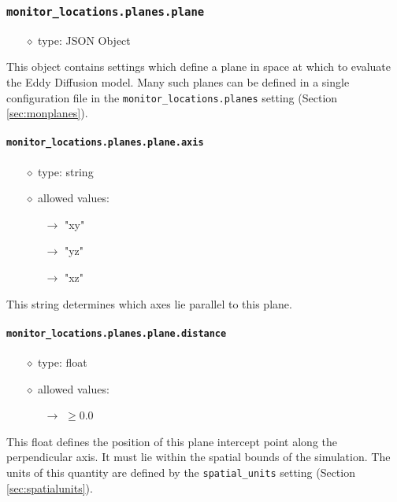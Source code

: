 \documentclass[]{article}
\def\code#1{\texttt{#1}}
\begin{document}
\subsubsection{\code{monitor\_locations.planes.plane}}
\begin{itemize}
    \item[$\diamond$] type: JSON Object 
\end{itemize}
This object contains settings which define a plane in space at which to evaluate
the Eddy Diffusion model. Many such planes can be defined in a single
configuration file in the \code{monitor\_locations.planes} setting (Section
\ref{sec:monplanes}).

\paragraph{\code{monitor\_locations.planes.plane.axis}}
\begin{itemize}
    \item[$\diamond$] type: string 
    \item[$\diamond$] allowed values:
    \begin{itemize}
        \item[$\rightarrow$] "xy"
        \item[$\rightarrow$] "yz"
        \item[$\rightarrow$] "xz"
    \end{itemize}
\end{itemize}
This string determines which axes lie parallel to this plane.

\paragraph{\code{monitor\_locations.planes.plane.distance}}
\begin{itemize}
    \item[$\diamond$] type: float 
    \item[$\diamond$] allowed values:
    \begin{itemize}
        \item[$\rightarrow$] $\geq0.0$ 
    \end{itemize}
\end{itemize}
This float defines the position of this plane intercept point along the
perpendicular axis. It must lie within the spatial bounds of the simulation. The
units of this quantity are defined by the \code{spatial\_units} setting (Section
\ref{sec:spatialunits}).
\end{document}
